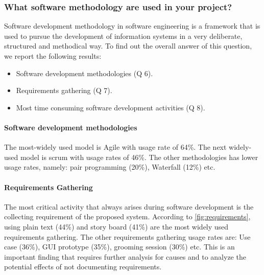 \subsubsection{What software methodology are used in your project?}
\label{methodology}
Software development methodology in software engineering is a framework that is used to pursue the development of information systems in a very deliberate, structured and methodical way. To find out the overall answer of this question, we report the following results:
\begin{itemize}
\item Software development methodologies (Q 6).
\item Requirements gathering (Q 7).
\item Most time consuming software development activities (Q 8).
\end{itemize}

\paragraph{Software development methodologies}
The most-widely used model is Agile with usage rate of 64\%. The next widely-used model is scrum with usage rates of 46\%. The other methodologies has lower usage rates, namely: pair programming (20\%), Waterfall (12\%) etc.


\paragraph{Requirements Gathering}
The most critical activity that always arises during software development is the collecting requirement of the proposed system. According to \ref{fig:requirements}, using plain text (44\%) and story board (41\%) are the most widely used requirements gathering. The other requirements gathering usage rates are: Use case (36\%), GUI prototype (35\%), grooming session (30\%) etc. This is an important finding that requires further analysis for causes and to analyze the potential effects of not documenting requirements.


